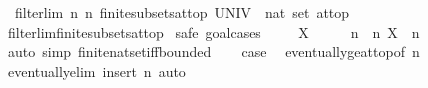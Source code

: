 \begin{isabellebody}
\ \ {\isachardoublequoteopen}filterlim\ {\isacharparenleft}{\kern0pt}{\isasymlambda}n{\isachardot}{\kern0pt}\ {\isacharbraceleft}{\kern0pt}{\isachardot}{\kern0pt}{\isachardot}{\kern0pt}{\isacharless}{\kern0pt}n{\isacharbraceright}{\kern0pt}{\isacharparenright}{\kern0pt}\ {\isacharparenleft}{\kern0pt}finite{\isacharunderscore}{\kern0pt}subsets{\isacharunderscore}{\kern0pt}at{\isacharunderscore}{\kern0pt}top\ {\isacharparenleft}{\kern0pt}UNIV\ {\isacharcolon}{\kern0pt}{\isacharcolon}{\kern0pt}\ nat\ set{\isacharparenright}{\kern0pt}{\isacharparenright}{\kern0pt}\ at{\isacharunderscore}{\kern0pt}top{\isachardoublequoteclose}\isanewline
%
\isadelimproof
\ \ %
\endisadelimproof
%
\isatagproof
{}\isamarkupfalse%
\ filterlim{\isacharunderscore}{\kern0pt}finite{\isacharunderscore}{\kern0pt}subsets{\isacharunderscore}{\kern0pt}at{\isacharunderscore}{\kern0pt}top\isanewline
{}\isamarkupfalse%
\ {\isacharparenleft}{\kern0pt}safe{\isacharcomma}{\kern0pt}\ goal{\isacharunderscore}{\kern0pt}cases{\isacharparenright}{\kern0pt}\isanewline
\ \ \isamarkupfalse%
\ {\isacharparenleft}{\kern0pt}{}\ X{\isacharparenright}{\kern0pt}\isanewline
\ \ \isamarkupfalse%
\ \isamarkupfalse%
\ n\ \ n{\isacharcolon}{\kern0pt}\ {\isachardoublequoteopen}X\ {\isasymsubseteq}\ {\isacharbraceleft}{\kern0pt}{\isachardot}{\kern0pt}{\isachardot}{\kern0pt}{\isacharless}{\kern0pt}n{\isacharbraceright}{\kern0pt}{\isachardoublequoteclose}\ \isamarkupfalse%
\ {\isacharparenleft}{\kern0pt}auto\ simp{\isacharcolon}{\kern0pt}\ finite{\isacharunderscore}{\kern0pt}nat{\isacharunderscore}{\kern0pt}set{\isacharunderscore}{\kern0pt}iff{\isacharunderscore}{\kern0pt}bounded{\isacharparenright}{\kern0pt}\isanewline
\ \ \isamarkupfalse%
\ {\isacharquery}{\kern0pt}case\ \isamarkupfalse%
\ eventually{\isacharunderscore}{\kern0pt}ge{\isacharunderscore}{\kern0pt}at{\isacharunderscore}{\kern0pt}top{\isacharbrackleft}{\kern0pt}of\ n{\isacharbrackright}{\kern0pt}\isanewline
\ \ \ \ \isamarkupfalse%
\ eventually{\isacharunderscore}{\kern0pt}elim\ {\isacharparenleft}{\kern0pt}insert\ n{\isacharcomma}{\kern0pt}\ auto{\isacharparenright}{\kern0pt}\isanewline
{}\isamarkupfalse%
%
\endisatagproof
{\isafoldproof}%
%
\isadelimproof
%
\endisadelimproof
%
\isadelimdocument
%
\endisadelimdocument
%
\isatagdocument
%
\isamarkuptrue%
%
\endisatagdocument

\end{isabellebody}

